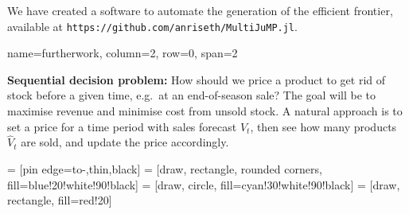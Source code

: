 \documentclass[a0paper,portrait,fontscale=0.35]{baposter}
\makeatletter
\def\tikzscale{1}\begin{lrbox}{\measure@tikzpicture}%
\edef\tikzscale{\pgfmathresult}%
\makeatother
\begin{document}
\begin{poster}
{\begin{minipage}{0.5\textwidth}
\begin{scaletikzpicturetowidth}{0.9\textwidth}
      \end{scaletikzpicturetowidth}
    \end{minipage}

    \vspace{0.5em}
    We have created a software to automate the generation of the
    efficient frontier, available at
    \texttt{https://github.com/anriseth/MultiJuMP.jl}.
  }

  {name=furtherwork, column=2, row=0, span=2}
  {
    \textbf{Sequential decision problem:}
    How should we price a product to get rid of stock before a given
    time, e.g.~at an end-of-season sale?
    The goal will be to maximise revenue and minimise cost from unsold
    stock.
    A natural approach is to set a price for a time period with
    sales forecast $V_t$, then see
    how many products $\hat{V}_t$ are sold, and update the price accordingly.
    \begin{center}
      \begin{scaletikzpicturetowidth}{0.9\textwidth}
         = [pin edge={to-,thin,black}]
         = [draw, rectangle, rounded corners, fill=blue!20!white!90!black]
         = [draw, circle, fill=cyan!30!white!90!black]
         = [draw, rectangle, fill=red!20]

\end{scaletikzpicturetowidth}
\end{center}}
\end{poster}
\end{document}
